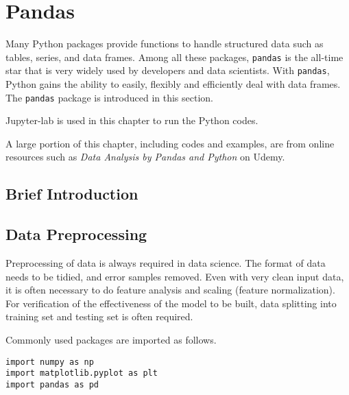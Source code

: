 \chapter{Pandas} \label{ch:pandas}

Many Python packages provide functions to handle structured data such as tables, series, and data frames. Among all these packages, \verb|pandas| is the all-time star that is very widely used by developers and data scientists. With \verb|pandas|, Python gains the ability to easily, flexibly and efficiently deal with data frames. The \verb|pandas| package is introduced in this section.

Jupyter-lab is used in this chapter to run the Python codes. 

A large portion of this chapter, including codes and examples, are from online resources such as \textit{Data Analysis by Pandas and Python} on Udemy.

\section{Brief Introduction}

\section{Data Preprocessing}

Preprocessing of data is always required in data science. The format of data needs to be tidied, and error samples removed. Even with very clean input data, it is often necessary to do feature analysis and scaling (feature normalization). For verification of the effectiveness of the model to be built, data splitting into training set and testing set is often required.

Commonly used packages are imported as follows.
\begin{lstlisting}
import numpy as np
import matplotlib.pyplot as plt
import pandas as pd
\end{lstlisting} 